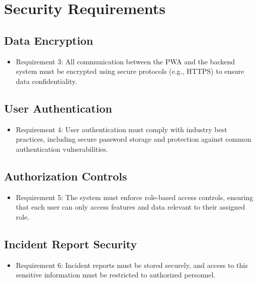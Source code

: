 \documentclass{scrreprt}
\begin{document}
\section{Security Requirements}

\subsection{Data Encryption}

\begin{itemize}
    \item Requirement 3: All communication between the PWA and the backend system must be encrypted using secure protocols (e.g., HTTPS) to ensure data confidentiality.
\end{itemize}

\subsection{User Authentication}

\begin{itemize}
    \item Requirement 4: User authentication must comply with industry best practices, including secure password storage and protection against common authentication vulnerabilities.
\end{itemize}

\subsection{Authorization Controls}

\begin{itemize}
    \item Requirement 5: The system must enforce role-based access controls, ensuring that each user can only access features and data relevant to their assigned role.
\end{itemize}

\subsection{Incident Report Security}

\begin{itemize}
    \item Requirement 6: Incident reports must be stored securely, and access to this sensitive information must be restricted to authorized personnel.
\end{itemize}
\end{document}
